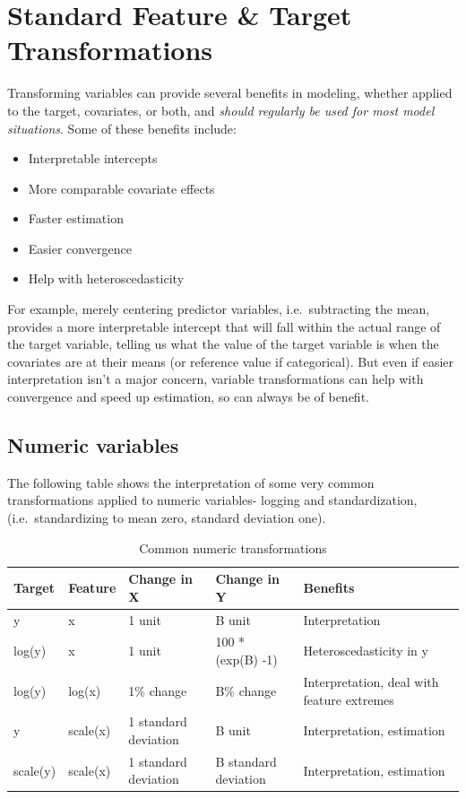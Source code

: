 \documentclass[
  letterpaper,
]{krantz}
\providecommand{\tightlist}{%
  \setlength{\itemsep}{0pt}\setlength{\parskip}{0pt}}\usepackage{longtable,booktabs,array}
\begin{document}
\section{Standard Feature \& Target
Transformations}\label{sec-data-transfromations}

Transforming variables can provide several benefits in modeling, whether
applied to the target, covariates, or both, and \emph{should regularly
be used for most model situations}. Some of these benefits include:

\begin{itemize}
\tightlist
\item
  Interpretable intercepts
\item
  More comparable covariate effects
\item
  Faster estimation
\item
  Easier convergence
\item
  Help with heteroscedasticity
\end{itemize}

For example, merely centering predictor variables, i.e.~subtracting the
mean, provides a more interpretable intercept that will fall within the
actual range of the target variable, telling us what the value of the
target variable is when the covariates are at their means (or reference
value if categorical). But even if easier interpretation isn't a major
concern, variable transformations can help with convergence and speed up
estimation, so can always be of benefit.

\subsection{Numeric variables}\label{numeric-variables}

The following table shows the interpretation of some very common
transformations applied to numeric variables- logging and
standardization, (i.e.~standardizing to mean zero, standard deviation
one).

\begin{longtable}{lllll}

\caption{\label{tbl-transformation}Common numeric transformations}

\tabularnewline

\toprule
Target & Feature & Change in X & Change in Y & Benefits \\ 
\midrule\addlinespace[2.5pt]
y & x & 1 unit & B unit & Interpretation \\ 
log(y) & x & 1 unit & 100 * (exp(B) -1)  & Heteroscedasticity in y \\ 
log(y) & log(x) & 1\% change & B\% change & Interpretation, deal with feature extremes \\ 
y & scale(x) & 1 standard deviation & B unit & Interpretation, estimation \\ 
scale(y) & scale(x) & 1 standard deviation & B standard deviation & Interpretation, estimation \\ 
\bottomrule

\end{longtable}
\end{document}
